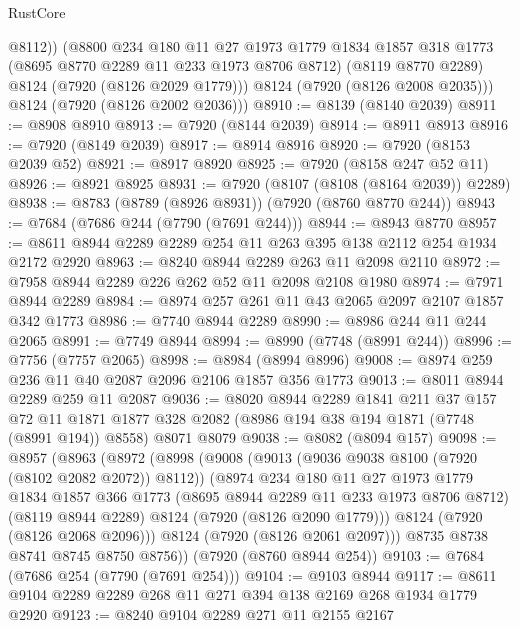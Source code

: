 \begin{lexlean}{RustCore}
\begin{coremodule}
            @8112))
        (@8800
          @234
          @180
          @11
          @27
          @1973
          @1779
          @1834
          @1857
          @318
          @1773
          (@8695 @8770 @2289 @11 @233 @1973 @8706 @8712)
          (@8119 @8770 @2289)
          @8124
          (@7920 (@8126 @2029 @1779)))
        @8124
        (@7920 (@8126 @2008 @2035)))
      @8124
      (@7920 (@8126 @2002 @2036)))
@8910 := @8139 (@8140 @2039)
@8911 := @8908 @8910
@8913 := @7920 (@8144 @2039)
@8914 := @8911 @8913
@8916 := @7920 (@8149 @2039)
@8917 := @8914 @8916
@8920 := @7920 (@8153 @2039 @52)
@8921 := @8917 @8920
@8925 := @7920 (@8158 @247 @52 @11)
@8926 := @8921 @8925
@8931 := @7920 (@8107 (@8108 (@8164 @2039)) @2289)
@8938 := @8783 (@8789 (@8926 @8931)) (@7920 (@8760 @8770 @244))
@8943 := @7684 (@7686 @244 (@7790 (@7691 @244)))
@8944 := @8943 @8770
@8957 := @8611 @8944 @2289 @2289 @254 @11 @263 @395 @138 @2112 @254 @1934 @2172 @2920
@8963 := @8240 @8944 @2289 @263 @11 @2098 @2110
@8972 := @7958 @8944 @2289 @226 @262 @52 @11 @2098 @2108 @1980
@8974 := @7971 @8944 @2289
@8984 := @8974 @257 @261 @11 @43 @2065 @2097 @2107 @1857 @342 @1773
@8986 := @7740 @8944 @2289
@8990 := @8986 @244 @11 @244 @2065
@8991 := @7749 @8944
@8994 := @8990 (@7748 (@8991 @244))
@8996 := @7756 (@7757 @2065)
@8998 := @8984 (@8994 @8996)
@9008 := @8974 @259 @236 @11 @40 @2087 @2096 @2106 @1857 @356 @1773
@9013 := @8011 @8944 @2289 @259 @11 @2087
@9036 := @8020
    @8944
    @2289
    @1841
    @211
    @37
    @157
    @72
    @11
    @1871
    @1877
    @328
    @2082
    (@8986 @194 @38 @194 @1871 (@7748 (@8991 @194)) @8558)
    @8071
    @8079
@9038 := @8082 (@8094 @157)
@9098 := @8957
    (@8963
      (@8972
        (@8998
          (@9008
            (@9013 (@9036 @9038 @8100 (@7920 (@8102 @2082 @2072)) @8112))
            (@8974
              @234
              @180
              @11
              @27
              @1973
              @1779
              @1834
              @1857
              @366
              @1773
              (@8695 @8944 @2289 @11 @233 @1973 @8706 @8712)
              (@8119 @8944 @2289)
              @8124
              (@7920 (@8126 @2090 @1779)))
            @8124
            (@7920 (@8126 @2068 @2096)))
          @8124
          (@7920 (@8126 @2061 @2097)))
        @8735
        @8738
        @8741
        @8745
        @8750
        @8756))
    (@7920 (@8760 @8944 @254))
@9103 := @7684 (@7686 @254 (@7790 (@7691 @254)))
@9104 := @9103 @8944
@9117 := @8611 @9104 @2289 @2289 @268 @11 @271 @394 @138 @2169 @268 @1934 @1779 @2920
@9123 := @8240 @9104 @2289 @271 @11 @2155 @2167

\end{coremodule}
\end{lexlean}
